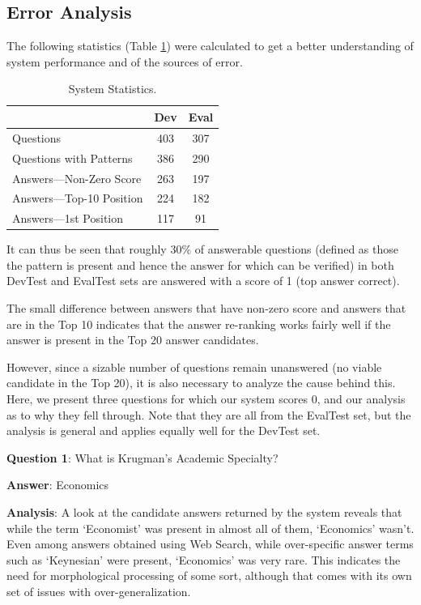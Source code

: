 \documentclass[11pt]{article}
\begin{document}
\subsection{Error Analysis}
The following statistics (Table \ref{stats}) were calculated to get a better understanding of system performance and of the sources of error. 

\begin{table}[h]
\begin{center}
\begin{tabular}{ |l |c |c| }
\hline
& Dev & Eval\\
\hline
Questions & 403 & 307\\
Questions with Patterns & 386 & 290\\
Answers---Non-Zero Score & 263 & 197\\
Answers---Top-10 Position & 224 & 182\\
Answers---1st Position & 117 & 91\\
\hline
\end{tabular}
\end{center}
\caption{\label{stats} System Statistics. 
}
\end{table}
It can thus be seen that roughly 30\% of answerable questions (defined as those the pattern is present and hence the answer for which can be verified) in both DevTest and EvalTest sets are answered with a score of 1 (top answer correct).

The small difference between answers that have non-zero score and answers that are in the Top 10 indicates that the answer re-ranking works fairly well if the answer is present in the Top 20 answer candidates. 

However, since a sizable number of questions remain unanswered (no viable candidate in the Top 20), it is also necessary to analyze the cause behind this.  Here, we present three questions for which our system scores 0, and our analysis as to why they fell through. Note that they are all from the EvalTest set, but the analysis is general and applies equally well for the DevTest set.


\noindent \textbf{Question 1}: What is Krugman's Academic Specialty? 

\noindent \textbf{Answer}: Economics

\noindent \textbf{Analysis}: A look at the candidate answers returned by the system reveals that while the term `Economist' was present in almost all of them, `Economics' wasn't. Even among answers obtained using Web Search, while over-specific answer terms such as `Keynesian' were present, `Economics' was very rare. This indicates the need for morphological processing of some sort, although that comes with its own set of issues with over-generalization.
\end{document}
